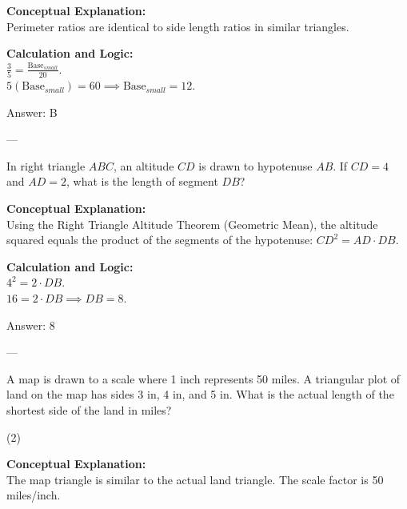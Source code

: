 \documentclass[11pt,paper=a4,answers]{exam}
\begin{document}
\begin{questions}
\begin{solution}
\textbf{Conceptual Explanation:} \\
Perimeter ratios are identical to side length ratios in similar triangles.

\vspace{10pt}
\textbf{Calculation and Logic:} \\
$\frac{3}{5} = \frac{\text{Base}_{small}}{20}$. \\
$5(\text{Base}_{small}) = 60 \implies \text{Base}_{small} = 12$.

\vspace{15pt}
Answer: \colorbox{yellow!100}{B}
\end{solution}

---

\question
In right triangle $ABC$, an altitude $CD$ is drawn to hypotenuse $AB$. If $CD = 4$ and $AD = 2$, what is the length of segment $DB$?

\begin{solution}
\textbf{Conceptual Explanation:} \\
Using the Right Triangle Altitude Theorem (Geometric Mean), the altitude squared equals the product of the segments of the hypotenuse: $CD^2 = AD \cdot DB$.

\vspace{10pt}
\textbf{Calculation and Logic:} \\
$4^2 = 2 \cdot DB$. \\
$16 = 2 \cdot DB \implies DB = 8$.

\vspace{15pt}
Answer: \colorbox{yellow!100}{8}
\end{solution}

---

\question
A map is drawn to a scale where 1 inch represents 50 miles. A triangular plot of land on the map has sides 3 in, 4 in, and 5 in. What is the actual length of the shortest side of the land in miles?
\begin{tasks}(2)
\end{tasks}

\begin{solution}
\textbf{Conceptual Explanation:} \\
The map triangle is similar to the actual land triangle. The scale factor is 50 miles/inch.


\end{solution}
\end{questions}
\end{document}
